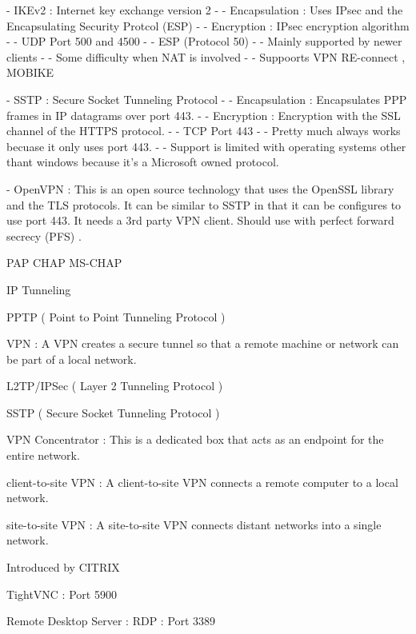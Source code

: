 - IKEv2 : Internet key exchange version 2
- - Encapsulation : Uses IPsec and the Encapsulating Security Protcol (ESP)
- - Encryption : IPsec encryption algorithm
- - UDP Port 500 and 4500
- - ESP (Protocol 50)
- - Mainly supported by newer clients
- - Some difficulty when NAT is involved
- - Suppoorts VPN RE-connect , MOBIKE

- SSTP : Secure Socket Tunneling Protocol
- - Encapsulation : Encapsulates PPP frames in IP datagrams over port 443.
- - Encryption : Encryption with the SSL channel of the HTTPS protocol.
- - TCP Port 443
- - Pretty much always works becuase it only uses port 443.
- - Support is limited with operating systems other thant windows because it's a
Microsoft owned protocol.

- OpenVPN : This is an open source technology that uses the OpenSSL library and
the TLS protocols. It can be similar to SSTP in that it can be configures to use
port 443. It needs a 3rd party VPN client. Should use with perfect forward
secrecy (PFS) .

PAP
CHAP
MS-CHAP





IP Tunneling

PPTP ( Point to Point Tunneling Protocol )

VPN : A VPN creates a secure tunnel so that a remote machine or network can be
part of a local network.

L2TP/IPSec ( Layer 2 Tunneling Protocol )

SSTP ( Secure Socket Tunneling Protocol )

VPN Concentrator : This is a dedicated box that acts as an endpoint for the
entire network.

client-to-site VPN : A client-to-site VPN connects a remote computer to a local
network.

site-to-site VPN : A site-to-site VPN connects distant networks into a single
network.




Introduced by CITRIX

TightVNC : Port 5900

Remote Desktop Server : RDP : Port 3389




